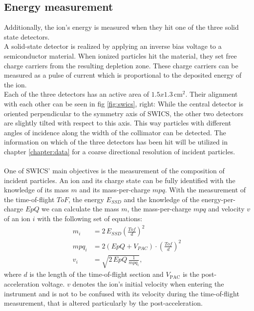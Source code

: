 \subsection{Energy measurement}
Additionally, the ion's energy is measured when they hit one of the three solid state detectors. \\
A solid-state detector is realized by applying an inverse bias voltage to a semiconductor material. When ionized particles hit the material, they set free charge carriers from the resulting depletion zone. These charge carriers can be measured as a pulse of current which is proportional to the deposited energy of the ion. \\
Each of the three detectors has an active area of $1.5 x 1.3 \,\mathrm{cm^2}$. Their alignment with each other can be seen in fig \ref{fig:swics}, right: While the central detector is oriented perpendicular to the symmetry axis of SWICS, the other two detectors are slightly tilted with respect to this axis. This way particles with different angles of incidence along the width of the collimator can be detected. The information on which of the three detectors has been hit will be utilized in chapter \ref{chapter:data} for a coarse directional resolution of incident particles.
\\ \\
One of SWICS' main objectives is the measurement of the composition of incident particles. An ion and its charge state can be fully identified with the knowledge of its mass $m$ and its mass-per-charge $mpq$. 
With the measurement of the time-of-flight $ToF$, the energy $E_{SSD}$ and the knowledge of the energy-per-charge $EpQ$ we can calculate the mass $m$, the mass-per-charge $mpq$ and velocity $v$ of an ion $i$ with the following set of equations:
\begin{align}
m_i &= 2\,E_{SSD} \left( \frac{Tof}{d}\right)^2 \label{eq:swics_set1}\\
mpq_i &= 2 \left(EpQ + V_{PAC}\right) \cdot \left(\frac{Tof}{d}\right)^2 \label{eq:swics_set2} \\
v_i &= \sqrt{2\,EpQ\,\frac{1}{mpq_i}},
\label{eq:swics_set3}
\end{align}
where $d$ is the length of the time-of-flight section and $V_{\mathrm{PAC}}$ is the post-acceleration voltage. $v$ denotes the ion's initial velocity when entering the instrument and is not to be confused with its velocity during the time-of-flight measurement, that is altered particularly by the post-acceleration.
%
%
%
